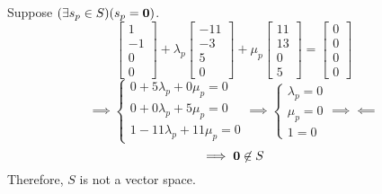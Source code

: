 \documentclass[a4paper]{article}
\begin{document}
Suppose \((\exists s_p\in S)(s_p={\bf 0})\).
\[\begin{bmatrix}1\\-1\\0\\0\end{bmatrix}+
\lambda_p\begin{bmatrix}-11\\-3\\5\\0\end{bmatrix}+\mu_p\begin{bmatrix}11\\13\\0\\5\end{bmatrix}=\begin{bmatrix}0\\0\\0\\0\end{bmatrix}\]
\[
	\implies\begin{cases}
	0+5\lambda_p+0\mu_p=0\\
	0+0\lambda_p+5\mu_p=0\\
	1-11\lambda_p+11\mu_p=0
\end{cases}
	\implies\begin{cases}
		\lambda_p=0\\
		\mu_p=0\\
		1=0
\end{cases}
\implies\impliedby
\]
\[\implies{\bf0}\not\in S\]
Therefore, \(S\) is not a vector space.
\end{document}
